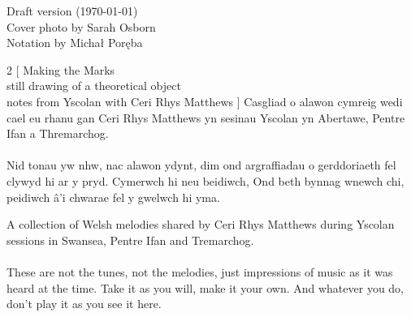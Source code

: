 \newpage


\setlength{\columnsep}{0.5cm}

\noindent
\begin{minipage}[b][\textheight]{0.3\textwidth}
    \strut
    Draft version (\today)
    \\
    Cover photo by Sarah Osborn
    \\
    Notation by Michał Poręba
\end{minipage}%
\hfill
\begin{minipage}[b]{0.7\textwidth}
    \begin{multicols}{2}
    [
      \Huge{Making the Marks} \\
      \large{still drawing of a theoretical object}\\
      \large{notes from Yscolan with Ceri Rhys Matthews}
      \vspace{1.5cm}
    ]
    \normalsize{
      \noindent Casgliad o alawon cymreig wedi cael eu rhanu gan Ceri Rhys Matthews
      yn sesinau Yscolan yn Abertawe, Pentre Ifan a Thremarchog.
      \\
      \\
      Nid tonau yw nhw, nac alawon ydynt, dim ond argraffiadau o gerddoriaeth
      fel clywyd hi ar y pryd. Cymerwch hi neu beidiwch, Ond beth bynnag wnewch chi,
      peidiwch â'i chwarae fel y gwelwch hi yma.
    }

    \newcolumn

    \normalsize{
      \noindent A collection of Welsh melodies shared by Ceri Rhys Matthews
      during Yscolan sessions in Swansea, Pentre Ifan and Tremarchog.
      \\
      \\
      These are not the tunes, not the melodies, just impressions of music
      as it was heard at the time. Take it as you will, make it your own.
      And whatever you do, don't play it as you see it here.
    }

    \end{multicols}

\end{minipage}
